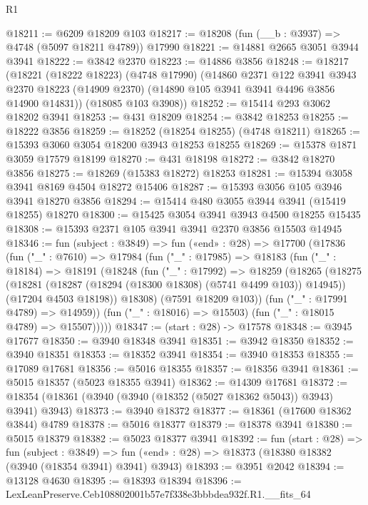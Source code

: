 \begin{lexlean}{R1}
\begin{coremodule}
@18211 := @6209 @18209 @103
@18217 := @18208 (fun (__b : @3937) => @4748 (@5097 @18211 @4789)) @17990
@18221 := @14881 @2665 @3051 @3944 @3941
@18222 := @3842 @2370
@18223 := @14886 @3856
@18248 := @18217
    (@18221
      (@18222 @18223)
      (@4748 @17990)
      (@14860
        @2371
        @122
        @3941
        @3943
        @2370
        @18223
        (@14909 @2370)
        (@14890 @105 @3941 @3941 @4496 @3856 @14900 @14831))
      (@18085 @103 @3908))
@18252 := @15414 @293 @3062 @18202 @3941
@18253 := @431 @18209
@18254 := @3842 @18253
@18255 := @18222 @3856
@18259 := @18252 (@18254 @18255) (@4748 @18211)
@18265 := @15393 @3060 @3054 @18200 @3943 @18253 @18255
@18269 := @15378 @1871 @3059 @17579 @18199
@18270 := @431 @18198
@18272 := @3842 @18270 @3856
@18275 := @18269 (@15383 @18272) @18253
@18281 := @15394 @3058 @3941 @8169 @4504 @18272 @15406
@18287 := @15393 @3056 @105 @3946 @3941 @18270 @3856
@18294 := @15414 @480 @3055 @3944 @3941 (@15419 @18255) @18270
@18300 := @15425 @3054 @3941 @3943 @4500 @18255 @15435
@18308 := @15393 @2371 @105 @3941 @3941 @2370 @3856 @15503 @14945
@18346 := fun (subject : @3849) =>
  fun («end» : @28) =>
  @17700
    (@17836
      (fun ("_" : @7610) =>
      @17984
        (fun ("_" : @17985) =>
        @18183
          (fun ("_" : @18184) =>
          @18191
            (@18248
              (fun ("_" : @17992) =>
              @18259
                (@18265
                  (@18275
                    (@18281 (@18287 (@18294 (@18300 @18308) (@5741 @4499 @103)) @14945))
                    (@17204 @4503 @18198))
                  @18308)
                (@7591 @18209 @103))
              (fun ("_" : @17991 @4789) => @14959))
            (fun ("_" : @18016) => @15503)
            (fun ("_" : @18015 @4789) => @15507)))))
@18347 := (start : @28) -> @17578
@18348 := @3945 @17677
@18350 := @3940 @18348 @3941
@18351 := @3942 @18350
@18352 := @3940 @18351
@18353 := @18352 @3941
@18354 := @3940 @18353
@18355 := @17089 @17681
@18356 := @5016 @18355
@18357 := @18356 @3941
@18361 := @5015 @18357 (@5023 @18355 @3941)
@18362 := @14309 @17681
@18372 := @18354 (@18361 (@3940 (@3940 (@18352 (@5027 @18362 @5043)) @3943) @3941) @3943)
@18373 := @3940 @18372
@18377 := @18361 (@17600 @18362 @3844) @4789
@18378 := @5016 @18377
@18379 := @18378 @3941
@18380 := @5015 @18379
@18382 := @5023 @18377 @3941
@18392 := fun (start : @28) =>
  fun (subject : @3849) =>
  fun («end» : @28) => @18373 (@18380 @18382 (@3940 (@18354 @3941) @3941) @3943)
@18393 := @3951 @2042
@18394 := @13128 @4630
@18395 := @18393 @18394
@18396 := LexLeanPreserve.Ceb108802001b57e7f338e3bbbdea932f.R1.__fits_64

\end{coremodule}
\end{lexlean}
